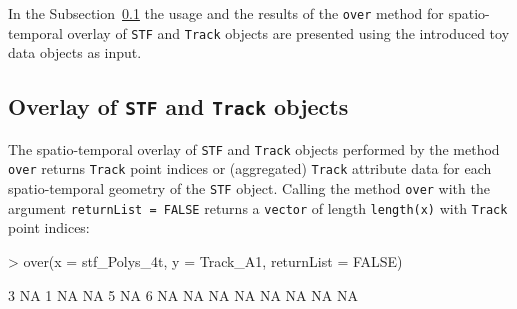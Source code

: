 \documentclass[12pt, oneside, a4paper]{scrbook}
\let\code=\texttt
\newcommand{\codeintitles}[1]{{\tt #1}} %
\begin{document}

\par\medskip

In the Subsection~\ref{subsec:overlayofstf} the usage and the results of the \code{over} method for spatio-temporal overlay of \code{STF} and \code{Track} objects are presented using the introduced toy data objects as input.


\subsection{Overlay of \codeintitles{STF} and \codeintitles{Track} objects}
\label{subsec:overlayofstf}

The spatio-temporal overlay of \code{STF} and \code{Track} objects performed by the method \code{over} returns \code{Track} point indices or (aggregated) \code{Track} attribute data for each spatio-temporal geometry of the \code{STF} object.
Calling the method \code{over} with the argument \code{returnList = FALSE} returns a \code{vector} of length \code{length(x)} with \code{Track} point indices:

\begin{small}
\begin{Schunk}
\begin{Sinput}
> over(x = stf_Polys_4t, y = Track_A1, returnList = FALSE)
\end{Sinput}
\begin{Soutput}
 [1]  3 NA  1 NA NA  5 NA  6 NA NA NA NA NA NA NA NA
\end{Soutput}
\end{Schunk}
\end{small}
\end{document}
